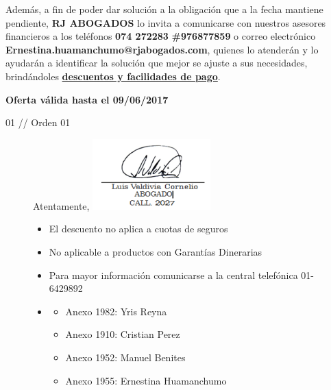 \noindent
Además, a fin de poder dar solución a la obligación que a la fecha mantiene pendiente, \textbf{RJ ABOGADOS} lo invita a comunicarse con nuestros asesores financieros a los teléfonos \textbf{074 272283} \textbf{\#976877859} o correo electrónico \textbf{Ernestina.huamanchumo@rjabogados.com}, quienes lo atenderán y lo ayudarán a identificar la solución que mejor se ajuste a sus necesidades, brindándoles \textbf{\underline{descuentos y facilidades de pago}}.\\

\begin{flushright}
\textbf{\Large Oferta válida hasta el 09/06/2017}
\end{flushright}

\noindent
{\scriptsize 01 // Orden 01}

\begin{figure}[h]
\begin{minipage}[b]{4.550833333cm}
Atentamente,
\includegraphics[natwidth=4.550833333cm, natheight=2.725208333cm]{resources/lawyer_signature2.png}
\end{minipage}
\begin{minipage}[b][2.5cm][t]{12cm}
\begin{flushright}    
{\footnotesize
    \begin{itemize}
        \item El descuento no aplica a cuotas de seguros
        \item No aplicable a productos con Garantías Dinerarias    
        \item[] Para mayor información comunicarse a la central telefónica 01-6429892      
        \item[] \begin{itemize}
                    \item Anexo 1982: Yris Reyna
                    \item Anexo 1910: Cristian Perez
                    \item Anexo 1952: Manuel Benites
                    \item Anexo 1955: Ernestina Huamanchumo
                \end{itemize}
    \end{itemize}}
\end{flushright}
\end{minipage}
\end{figure}

